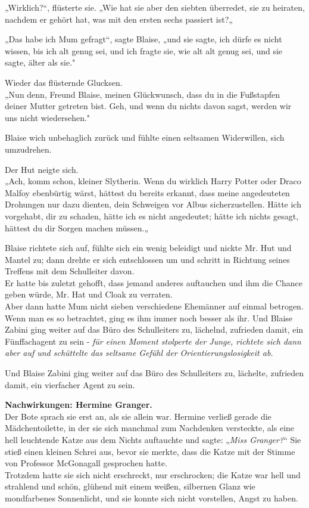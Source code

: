 {„Wirklich?“, flüsterte sie. „Wie hat sie aber den siebten überredet, sie zu heiraten, nachdem er gehört hat, was mit den ersten sechs passiert ist?„

„Das habe ich Mum gefragt“, sagte Blaise, „und sie sagte, ich dürfe es nicht wissen, bis ich alt genug sei, und ich fragte sie, wie alt alt genug sei, und sie sagte, älter als sie."

Wieder das flüsternde Glucksen.\\ „Nun denn, Freund Blaise, meinen Glückwunsch, dass du in die Fußstapfen deiner Mutter getreten bist. Geh, und wenn du nichts davon sagst, werden wir uns nicht wiedersehen."

Blaise wich unbehaglich zurück und fühlte einen seltsamen Widerwillen, sich umzudrehen.

Der Hut neigte sich.\\ „Ach, komm schon, kleiner Slytherin. Wenn du wirklich Harry Potter oder Draco Malfoy ebenbürtig wärst, hättest du bereits erkannt, dass meine angedeuteten Drohungen nur dazu dienten, dein Schweigen vor Albus sicherzustellen. Hätte ich vorgehabt, dir zu schaden, hätte ich es nicht angedeutet; hätte ich nichts gesagt, hättest du dir Sorgen machen müssen.„

Blaise richtete sich auf, fühlte sich ein wenig beleidigt und nickte Mr. Hut und Mantel zu; dann drehte er sich entschlossen um und schritt in Richtung seines Treffens mit dem Schulleiter davon.\\ Er hatte bis zuletzt gehofft, dass jemand anderes auftauchen und ihm die Chance geben würde, Mr. Hat und Cloak zu verraten.\\ Aber dann hatte Mum nicht sieben verschiedene Ehemänner auf einmal betrogen. Wenn man es so betrachtet, ging es ihm immer noch besser als ihr. Und Blaise Zabini ging weiter auf das Büro des Schulleiters zu, lächelnd, zufrieden damit, ein Fünffachagent zu sein - \emph{für einen Moment stolperte der Junge, richtete sich dann aber auf und schüttelte das seltsame Gefühl der Orientierungslosigkeit ab.}

Und Blaise Zabini ging weiter auf das Büro des Schulleiters zu, lächelte, zufrieden damit, ein vierfacher Agent zu sein.

\textbf{Nachwirkungen: Hermine Granger.}\\ Der Bote sprach sie erst an, als sie allein war. Hermine verließ gerade die Mädchentoilette, in der sie sich manchmal zum Nachdenken versteckte, als eine hell leuchtende Katze aus dem Nichts auftauchte und sagte: „\emph{Miss Granger?}“ Sie stieß einen kleinen Schrei aus, bevor sie merkte, dass die Katze mit der Stimme von Professor McGonagall gesprochen hatte.\\ Trotzdem hatte sie sich nicht erschreckt, nur erschrocken; die Katze war hell und strahlend und schön, glühend mit einem weißen, silbernen Glanz wie mondfarbenes Sonnenlicht, und sie konnte sich nicht vorstellen, Angst zu haben.

}

